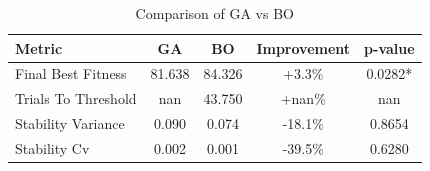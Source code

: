 \begin{table}[htbp]
\centering
\caption{Comparison of GA vs BO}
\label{tab:comparison}
\begin{tabular}{lcccc}
\hline
Metric & GA & BO & Improvement & p-value \\
\hline
Final Best Fitness & 81.638 & 84.326 & +3.3\% & 0.0282* \\
Trials To Threshold & nan & 43.750 & +nan\% & nan \\
Stability Variance & 0.090 & 0.074 & -18.1\% & 0.8654 \\
Stability Cv & 0.002 & 0.001 & -39.5\% & 0.6280 \\
\hline
\end{tabular}
\end{table}

